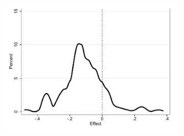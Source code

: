 \documentclass[oneside,11pt]{article}
\begin{document}
\begin{figure}[H]
\begin{center}
\begin{subfigure}{0.42\textwidth}
        \includegraphics[width=\textwidth]{Figuras/he_dist_def_c_pro_2.pdf}
    \end{subfigure}

    \end{center}
        \scriptsize 
        
\end{figure}
\end{document}
